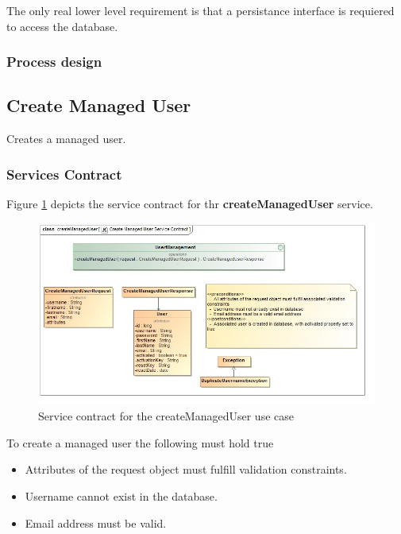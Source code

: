 The only real lower level requirement is that a persistance interface is requiered
to access the database.

\subsubsection{Process design}

\subsection{Create Managed User}
Creates a managed user.

\subsubsection{Services Contract}
Figure \ref{fig:createManagedUserServicesContract} depicts the service contract for thr \textbf{createManagedUser} service.

\begin{figure}[H]
	\begin{center}
		\includegraphics[scale=0.55]{../Diagrams and Charts/Users/Create Managed User Service Contract.jpg}
		\caption{Service contract for the createManagedUser use case}
		\label{fig:createManagedUserServicesContract}
	\end{center}
\end{figure}

To create a managed user the following must hold true
\begin{itemize}
	\item Attributes of the request object must fulfill validation constraints.
	\item Username cannot exist in the database.
	\item Email address must be valid.
\end{itemize}

